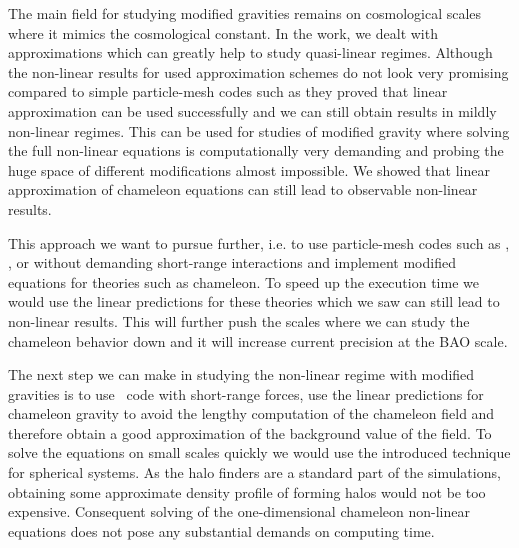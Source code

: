 The main field for studying modified gravities remains on cosmological scales where it mimics the cosmological constant. In the work, we dealt with approximations which can greatly help to study quasi-linear regimes. Although the non-linear results for used approximation schemes do not look very promising compared to simple particle-mesh codes such as  they proved that linear approximation can be used successfully and we can still obtain results in mildly non-linear regimes. This can be used for studies of modified gravity where solving the full non-linear equations is computationally very demanding and probing the huge space of different modifications almost impossible. We showed that linear approximation of chameleon equations can still lead to observable non-linear results.

This approach we want to pursue further, i.e. to use particle-mesh codes such as , , or  without demanding short-range interactions and implement modified equations for theories such as chameleon. To speed up the execution time we would use the linear predictions for these theories which we saw can still lead to non-linear results. This will further push the scales where we can study the chameleon behavior down and it will increase current precision at the BAO scale.

The next step we can make in studying the non-linear regime with modified gravities is to use \nbody\ code with short-range forces, use the linear predictions for chameleon gravity to avoid the lengthy computation of the chameleon field and therefore obtain a good approximation of the background value of the field. To solve the equations on small scales quickly we would use the introduced technique for spherical systems. As the halo finders are a standard part of the simulations, obtaining some approximate density profile of forming halos would not be too expensive. Consequent solving of the one-dimensional chameleon non-linear equations does not pose any substantial demands on computing time.